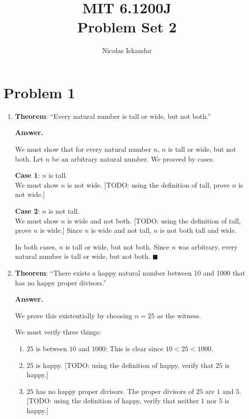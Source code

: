 \documentclass[11pt]{article}
\title{
    \vspace{-2em}
    MIT 6.1200J \\
    Problem Set 2
}
\author{Nicolas Iskandar}
\date{}
\newcommand{\answer}{
    \vspace{0.5em}
    \noindent\textbf{Answer.}
}
\begin{document}
\maketitle

\section*{Problem 1}

\begin{enumerate}[label=\textbf{(\alph*)}]

\item \textbf{Theorem}: ``Every natural number is tall or wide, but not both.''

\answer

We must show that for every natural number $n$, $n$ is tall or wide, but not both.
Let $n$ be an arbitrary natural number. We proceed by cases.

\textbf{Case 1}: $n$ is tall.\\
We must show $n$ is not wide. [TODO: using the definition of tall, prove $n$ is not wide.]

\textbf{Case 2}: $n$ is not tall.\\
We must show $n$ is wide and not both. [TODO: using the definition of tall, prove $n$
is wide.] Since $n$ is wide and not tall, $n$ is not both tall and wide.

In both cases, $n$ is tall or wide, but not both. Since $n$ was arbitrary, every natural
number is tall or wide, but not both. $\blacksquare$

\item \textbf{Theorem}: ``There exists a happy natural number between 10 and 1000 that
has no happy proper divisors.''

\answer

We prove this existentially by choosing $n = 25$ as the witness.

We must verify three things:
\begin{enumerate}[label=(\roman*)]
    \item $25$ is between $10$ and $1000$: This is clear since $10 < 25 < 1000$. \checkmark
    \item $25$ is happy. [TODO: using the definition of happy, verify that $25$ is happy.]
    \item $25$ has no happy proper divisors. The proper divisors of $25$ are $1$ and $5$.
    [TODO: using the definition of happy, verify that neither $1$ nor $5$ is happy.]
\end{enumerate}


\end{enumerate}
\end{document}
